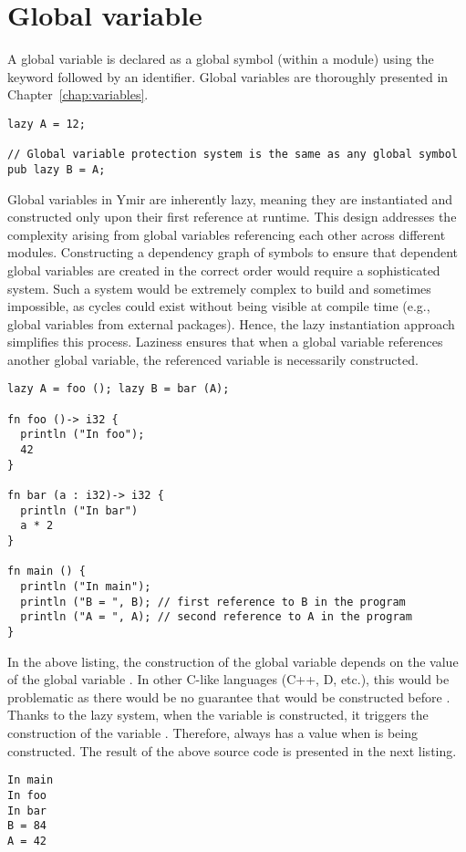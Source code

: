 \section{Global variable}%
\label{sec:global_variables}

A global variable is declared as a global symbol (within a module) using the
keyword  followed by an identifier. Global variables are thoroughly
presented in Chapter~\ref{chap:variables}.

\begin{lstlisting}[style=coloredverbatim]
lazy A = 12;

// Global variable protection system is the same as any global symbol
pub lazy B = A;
\end{lstlisting}

Global variables in Ymir are inherently lazy, meaning they are instantiated and
constructed only upon their first reference at runtime. This design addresses
the complexity arising from global variables referencing each other across
different modules. Constructing a dependency graph of symbols to ensure that
dependent global variables are created in the correct order would require a
sophisticated system. Such a system would be extremely complex to build and
sometimes impossible, as cycles could exist without being visible at compile
time (e.g., global variables from external packages). Hence, the lazy
instantiation approach simplifies this process. Laziness ensures that when a
global variable references another global variable, the referenced variable is
necessarily constructed.

\begin{lstlisting}[style=coloredverbatim]
lazy A = foo (); lazy B = bar (A);

fn foo ()-> i32 {
  println ("In foo");
  42
}

fn bar (a : i32)-> i32 {
  println ("In bar")
  a * 2
}

fn main () {
  println ("In main");
  println ("B = ", B); // first reference to B in the program
  println ("A = ", A); // second reference to A in the program
}
\end{lstlisting}

In the above listing, the construction of the global variable  depends
on the value of the global variable . In other C-like languages (C++,
D, etc.), this would be problematic as there would be no guarantee that
 would be constructed before . Thanks to the lazy system, when
the variable  is constructed, it triggers the construction of the
variable . Therefore,  always has a value when  is
being constructed. The result of the above source code is presented in the next
listing.

\begin{lstlisting}[style=bashVerb, escapechar=@+]
In main
In foo
In bar
B = 84
A = 42
\end{lstlisting}

\vfill%
\pagebreak
